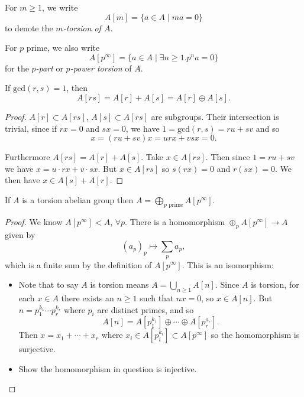 \begin{defn}
For $m \geq 1$, we write
$$
A[m] = \{ a \in A \mid m a = 0 \}
$$
to denote the \emph{$m$-torsion of $A$}.

For $p$ prime, we also write
$$
A[p^\infty] = \{ a \in A \mid \exists n \geq 1 . p^n a = 0 \}
$$
for the \emph{$p$-part} or \emph{$p$-power torsion} of $A$.
\end{defn}

\begin{lemma}
If $\mathrm{gcd}(r, s) = 1$, then
$$
A[rs] = A[r] + A[s] = A[r] \oplus A[s].
$$
\end{lemma}
\begin{proof}
$A[r] \subset A[rs]$, $A[s] \subset A[rs]$ are subgroups. Their
intersection is trivial, since if $r x = 0$ and $s x = 0$, we have
$1 = \mathrm{gcd}(r, s) = ru + sv$ and so
$$
x = (ru + sv)x = urx + vsx = 0.
$$

Furthermore $A[rs] = A[r] + A[s]$. Take
$x \in A[rs]$. Then since $1 = r u + s v$ we have
$x = u \cdot rx + v \cdot sx$. But $x \in A[rs]$ so
$s(rx) = 0$ and $r(sx) = 0$. We
then have $x \in A[s] + A[r]$.
\end{proof}

\begin{theorem}
If $A$ is a torsion abelian group then
$A = \bigoplus_{p \text{ prime}} A[p^\infty]$.
\end{theorem}
\begin{proof}
We know $A[p^\infty] < A$, $\forall p$. There is a homomorphism
$\oplus_p A[p^\infty] \to A$ given by
$$
(a_p)_p \mapsto \sum_p a_p,
$$
which is a finite sum by the definition of $A[p^\infty]$. This is an
isomorphism:
\begin{itemize}
\item{
  Note that to say $A$ is torsion means $A = \bigcup_{n \geq 1} A[n]$.
  Since $A$ is torsion, for each $x \in A$ there exists an $n \geq 1$
  such that $n x = 0$, so $x \in A[n]$. But
  $n = p_1^{k_1} \cdots p_r^{k_r}$ where $p_i$ are distinct primes,
  and so
  $$
  A[n] = A[p_1^{k_1}] \oplus \cdots \oplus A[p_r^{a_r}].
  $$
  Then $x = x_1 + \cdots + x_r$ where
  $x_i \in A[p_i^{k_i}] \subset A[p^\infty]$ so the homomorphism is surjective.
}
\item
{
  \begin{exer}
    Show the homomorphism in question is injective.
  \end{exer}
}
\end{itemize}
\end{proof}

